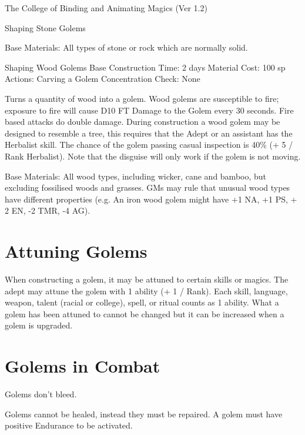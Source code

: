 \begin{Chapter}{The College of Binding and Animating Magics (Ver 1.2)}
\begin{ritual}[R-6]{Shaping Stone Golems }
\begin{effects}
Base Materials: All types of stone or rock which are normally solid.
\end{effects}
\end{ritual}

\begin{ritual}[R-7]{Shaping Wood Golems }
Base Construction Time: 2 days 
Material Cost: 100 sp 
Actions: Carving a Golem 
Concentration Check: None
\begin{effects}
Turns a quantity of wood into a golem.  Wood golems are susceptible to
fire; exposure to fire will cause D10 FT Damage to the Golem every 30
seconds.  Fire based attacks do double damage.  During construction a
wood golem may be designed to resemble a tree, this requires that the
Adept or an assistant has the Herbalist skill.  The chance of the
golem passing casual inspection is 40\% (+ 5 / Rank Herbalist). Note
that the disguise will only work if the golem is not moving.

Base Materials: All wood types, including wicker, cane and bamboo, but
excluding fossilised woods and grasses.  GMs may rule that unusual
wood types have different properties (e.g. An iron wood golem might
have +1 NA, +1 PS, + 2 EN, -2 TMR, -4 AG).
\end{effects}
\end{ritual}


\section{Attuning Golems}

When constructing a golem, it may be attuned to certain skills or
magics.  The adept may attune the golem with 1 ability (+ 1 / Rank).
Each skill, language, weapon, talent (racial or college), spell, or
ritual counts as 1 ability.  What a golem has been attuned to cannot
be changed but it can be increased when a golem is upgraded.


\section{Golems in Combat}

\begin{Description}

\item[Bleeding] Golems don’t bleed. 

\item[Damaged Golems] Golems cannot be healed, instead they must be
  repaired.  A golem must have positive Endurance to be activated.


\end{Description}
\end{Chapter}
